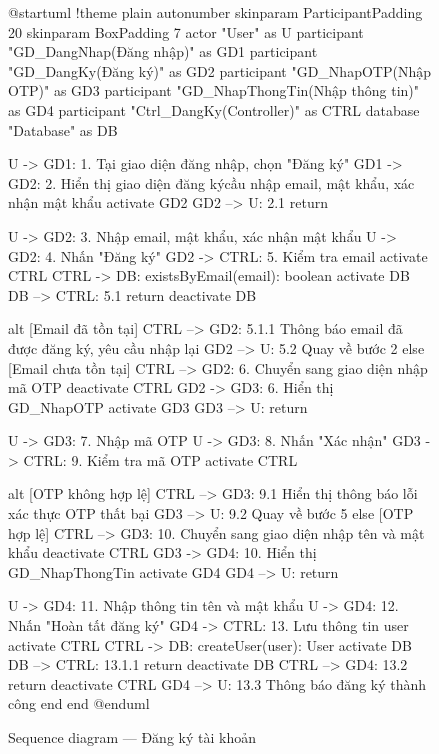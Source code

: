 \documentclass[12pt,a4paper]{report}
\begin{document}
\begin{figure}[H]
    \centering
    \begin{plantuml}
        @startuml
        !theme plain
        autonumber
        skinparam ParticipantPadding 20
        skinparam BoxPadding 7
        actor "User" as U
        participant "GD_DangNhap\n(Đăng nhập)" as GD1
        participant "GD_DangKy\n(Đăng ký)" as GD2
        participant "GD_NhapOTP\n(Nhập OTP)" as GD3
        participant "GD_NhapThongTin\n(Nhập thông tin)" as GD4
        participant "Ctrl_DangKy\n(Controller)" as CTRL
        database "Database" as DB

        U -> GD1: 1. Tại giao diện đăng nhập, chọn "Đăng ký"
        GD1 -> GD2: 2. Hiển thị giao diện đăng ký cầu nhập email, mật khẩu, xác nhận mật khẩu
        activate GD2
        GD2 --> U: 2.1 return

        U -> GD2: 3. Nhập email, mật khẩu, xác nhận mật khẩu
        U -> GD2: 4. Nhấn "Đăng ký"
        GD2 -> CTRL: 5. Kiểm tra email
        activate CTRL
        CTRL -> DB: existsByEmail(email): boolean
        activate DB
        DB --> CTRL: 5.1 return
        deactivate DB

        alt [Email đã tồn tại]
          CTRL --> GD2: 5.1.1 Thông báo email đã được đăng ký, yêu cầu nhập lại
          GD2 --> U: 5.2 Quay về bước 2
        else [Email chưa tồn tại]
          CTRL --> GD2: 6. Chuyển sang giao diện nhập mã OTP
          deactivate CTRL
          GD2 -> GD3: 6. Hiển thị GD_NhapOTP
          activate GD3
          GD3 --> U: return

          U -> GD3: 7. Nhập mã OTP
          U -> GD3: 8. Nhấn "Xác nhận"
          GD3 -> CTRL: 9. Kiểm tra mã OTP
          activate CTRL

          alt [OTP không hợp lệ]
            CTRL --> GD3: 9.1 Hiển thị thông báo lỗi xác thực OTP thất bại
            GD3 --> U: 9.2 Quay về bước 5
          else [OTP hợp lệ]
            CTRL --> GD3: 10. Chuyển sang giao diện nhập tên và mật khẩu
            deactivate CTRL
            GD3 -> GD4: 10. Hiển thị GD_NhapThongTin
            activate GD4
            GD4 --> U: return

            U -> GD4: 11. Nhập thông tin tên và mật khẩu
            U -> GD4: 12. Nhấn "Hoàn tất đăng ký"
            GD4 -> CTRL: 13. Lưu thông tin user
            activate CTRL
            CTRL -> DB: createUser(user): User
            activate DB
            DB --> CTRL: 13.1.1 return
            deactivate DB
            CTRL --> GD4: 13.2 return
            deactivate CTRL
            GD4 --> U: 13.3 Thông báo đăng ký thành công
          end
        end
        @enduml
    \end{plantuml}
    \caption{Sequence diagram --- Đăng ký tài khoản}
\end{figure}
\end{document}

